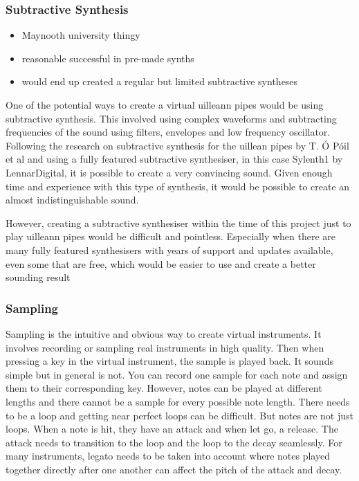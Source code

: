 \documentclass[12pt]{article}
\begin{document}
	\subsubsection{Subtractive Synthesis}
	\begin{itemize}
		\item Maynooth university thingy
		\item reasonable successful in pre-made synths
		\item would end up created a regular but limited subtractive syntheses
	\end{itemize}

	One of the potential ways to create a virtual uilleann pipes would be using subtractive synthesis. This involved using complex
	waveforms and subtracting frequencies of the sound using filters, envelopes and low frequency oscillator. Following the
	research on subtractive synthesis for the uillean pipes by T. Ó Póil et al and using a fully featured subtractive synthesiser,
	in this case Sylenth1 by LennarDigital, it is possible to create a very convincing sound. Given enough time and experience with
	this type of synthesis, it would be possible to create an almost indistinguishable sound.
	
	However, creating a subtractive synthesiser within the time of this project just to play uilleann pipes would be difficult and
	pointless. Especially when there are many fully featured synthesisers with years of support and updates available, even some 
	that are free, which would be easier to use and create a better sounding result
	
	
	
	\subsubsection{Sampling}
	Sampling is the intuitive and obvious way to create virtual instruments. It involves recording or sampling real instruments in high quality. Then when
	pressing a key in the virtual instrument, the sample is played back. It sounds simple but in general is not. You can record one sample for each note and assign them
	to their corresponding key. However, notes can be played at different lengths and there cannot be a sample for every possible note length. There needs to be a loop and 
	getting near perfect loops can be difficult. But notes are not just loops. When a note is hit, they have an attack and when let go, a release. The attack needs to transition
	to the loop and the loop to the decay seamlessly. For many instruments, legato needs to be taken into account where notes played together directly after one another
	can affect the pitch of the attack and decay.
	
\end{document}
